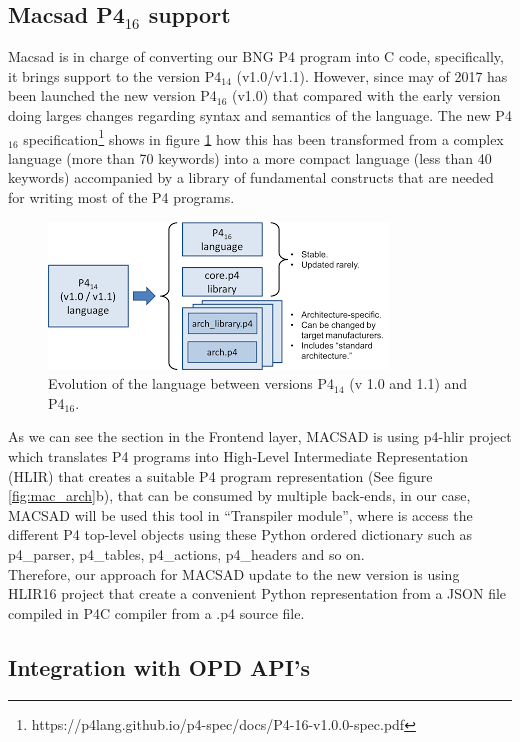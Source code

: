 \subsection{Macsad P4$_{16}$ support}
Macsad is in charge of converting our BNG P4 program into C code, specifically, it brings support to the version P4$_{14}$ (v1.0/v1.1). However, since may of 2017 has been launched the new version P4$_{16}$ (v1.0) that compared with the early version doing larges changes regarding syntax and semantics of the language.
The new P4$_{16}$ specification\footnote{https://p4lang.github.io/p4-spec/docs/P4-16-v1.0.0-spec.pdf} shows in figure \ref{fig:p4_evol} how this has been transformed from a complex language (more than 70 keywords) into a more compact language (less than 40 keywords) accompanied by a library of fundamental constructs that are needed for writing most of the P4 programs.

\begin{figure}[ht]
	\centering
	\includegraphics[width=0.7\linewidth] {figures/p4_evol.png}
	\caption{Evolution of the language between versions P4$_{14}$ (v 1.0 and 1.1) and P4$_{16}$.  
    }
 	\label{fig:p4_evol}
 \end{figure}

As we can see the section 
in the Frontend layer, MACSAD is using p4-hlir project which translates P4 programs into High-Level Intermediate Representation (HLIR) that creates a suitable P4 program representation (See figure \ref{fig:mac_arch}b), that can be consumed by multiple back-ends, in our case, MACSAD will be used this tool in “Transpiler module”, where is access the different P4 top-level objects using these Python ordered dictionary such as p4\_parser, p4\_tables, p4\_actions, p4\_headers and so on.\\
Therefore, our approach for MACSAD update to the new version is using HLIR16 project 
that create a convenient Python representation from a JSON file compiled in P4C compiler from a .p4 source file. 


\subsection{Integration with OPD API's}

